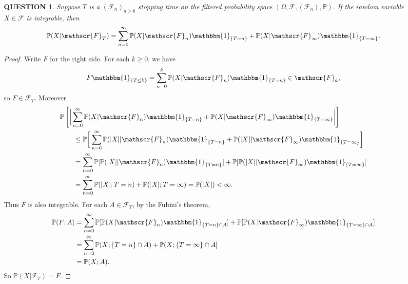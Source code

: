 \documentclass[12pt]{article}
\renewcommand{\(}{\left(}%
\renewcommand{\)}{\right)}%
\renewcommand{\[}{\left[}%
\renewcommand{\]}{\right]}%
\newcommand{\p}{\mathbb{P}}
\newcommand{\f}{\mathscr{F}}
\newtheorem{question}{QUESTION}[section]}
\newtheorem{proof}{Proof.}}
\begin{document}
  \begin{question}
   Suppose $T$ is a $(\f_n)_{n\geq 0}$ stopping time on the filtered probability space $(\Omega,\f,(\f_n),\p )$. If the random variable $X\in \f$ is integrable, then
   \begin{equation*}
    \p(X|\f_T)=\sum_{n=0}^\infty\p(X|\f_n)\mathbbm{1}_{\{T=n\}}+\p(X|\f_\infty)\mathbbm{1}_{\{T=\infty\}}.
   \end{equation*}
  \end{question}
  \begin{proof}
   Write $F$ for the right side. For each $k\geq 0$, we have
   \begin{equation*}
    F\mathbbm{1}_{\{T\leq k\}}=\sum_{n=0}^k\p(X|\f_n)\mathbbm{1}_{\{T=n\}}\in\f_k,
   \end{equation*}
   so $F\in\f_T$. Moreover
   \begin{equation*}
    \begin{split}
     &\p\[\bigg|\sum_{n=0}^\infty\p(X|\f_n)\mathbbm{1}_{\{T=n\}}+\p(X|\f_\infty)\mathbbm{1}_{\{T=\infty\}}\bigg|\]\\
     &\qquad \leq\p\bigg[\sum_{n=0}^\infty\p(|X||\f_n)\mathbbm{1}_{\{T=n\}}+\p(|X||\f_\infty)\mathbbm{1}_{\{T=\infty\}}\bigg]\\
     &\qquad=\sum_{n=0}^\infty\p[\p(|X||\f_n)\mathbbm{1}_{\{T=n\}}]+\p[\p(|X||\f_\infty)\mathbbm{1}_{\{T=\infty\}}]\\
     &\qquad=\sum_{n=0}^\infty\p(|X|;T=n)+\p(|X|;T=\infty)=\p(|X|)<\infty.
    \end{split}
   \end{equation*}
   Thus $F$ is also integrable. For each $A\in\f_T$, by the {\sffamily Fubini's theorem},
   \begin{equation*}
    \begin{split}
     \p(F;A)&=\sum_{n=0}^\infty\p[\p(X|\f_n)\mathbbm{1}_{\{T=n\}\cap A}]+\p[\p(X|\f_\infty)\mathbbm{1}_{\{T=\infty\}\cap A}]\\
     &=\sum_{n=0}^\infty\p(X;\{T=n\}\cap A)+\p(X;\{T=\infty\}\cap A]\\
     &=\p(X;A).
    \end{split}
   \end{equation*}
   So $\p(X|\f_T)=F$.
  \end{proof}
\end{document}

